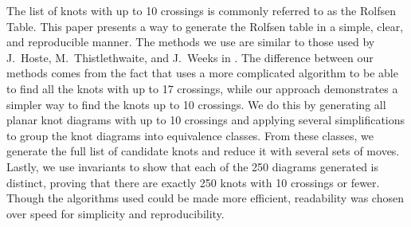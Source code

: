 
\code
\diagrams

\begin{paperabs}
The list of knots with up to 10 crossings is commonly referred to as the Rolfsen
Table.
This paper presents a way to generate the Rolfsen table in a simple, clear, and
reproducible manner.
The methods we use are similar to those used by J.~Hoste, M.~Thistlethwaite, and
J.~Weeks in \cite{htw}.
The difference between our methods comes from the fact that \cite{htw} uses a
more complicated algorithm to be able to find all the knots with up to 17
crossings, while our approach demonstrates a simpler way to find the knots up to
10 crossings.
We do this by generating all planar knot diagrams with up to 10 crossings and
applying several simplifications to group the knot diagrams into equivalence
classes.
From these classes, we generate the full list of candidate knots and reduce it
with several sets of moves.
Lastly, we use invariants to show that each of the 250 diagrams generated is
distinct,  proving that there are exactly 250 knots with 10 crossings or fewer.
Though the algorithms used could be made more efficient, readability was chosen
over speed for simplicity and reproducibility.
\end{paperabs}
